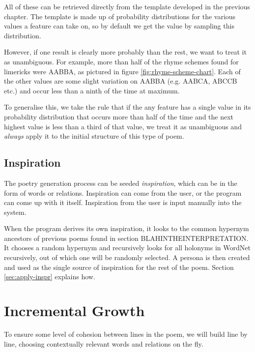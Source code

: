 All of these can be retrieved directly from the template developed in the previous chapter. The template is made up of probability distributions for the various values a feature can take on, so by default we get the value by sampling this distribution. 

However, if one result is clearly more probably than the rest, we want to treat it as unambiguous. For example, more than half of the rhyme schemes found for limericks were AABBA, as pictured in figure \ref{fig:rhyme-scheme-chart}. Each of the other values are some slight variation on AABBA (e.g. AABCA, ABCCB etc.) and occur less than a ninth of the time at maximum.

To generalise this, we take the rule that if the any feature has a single value in its probability distribution that occurs more than half of the time and the next highest value is less than a third of that value, we treat it as unambiguous and \textit{always} apply it to the initial structure of this type of poem.


\subsection{Inspiration}
The poetry generation process can be seeded \textit{inspiration}, which can be in the form of words or relations. Inspiration can come from the user, or the program can come up with it itself. Inspiration from the user is input manually into the system.

When the program derives its own inspiration, it looks to the common hypernym ancestors of previous poems found in section BLAHINTHEINTERPRETATION. It chooses a random hypernym and recursively looks for all holonyms in WordNet recursively, out of which one will be randomly selected. A persona is then created and used as the single source of inspiration for the rest of the poem. Section \ref{sec:apply-inspr} explains how.


\section{Incremental Growth}
\label{sec:inc-growth}
To ensure some level of cohesion between lines in the poem, we will build line by line, choosing contextually relevant words and relations on the fly. 

